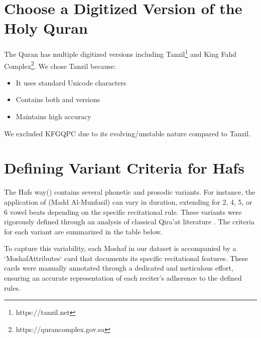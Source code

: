 
\section{Choose a Digitized Version of the Holy Quran}

The Quran has multiple digitized versions including Tanzil\footnote{https://tanzil.net} and King Fahd Complex\footnote{https://qurancomplex.gov.sa}. We chose Tanzil because:
\begin{itemize}
\item It uses standard Unicode characters
\item Contains both  and  versions
\item Maintains high accuracy
\end{itemize}

We excluded KFGQPC due to its evolving/unstable nature compared to Tanzil.



\section{Defining Variant Criteria for Hafs}

The Hafs way() contains several phonetic and prosodic variants. For instance, the application of  (Madd Al-Munfasil) can vary in duration, extending for 2, 4, 5, or 6 vowel beats depending on the specific recitational rule. These variants were rigorously defined through an analysis of classical Qira'at literature \cite{al-dabbaa}. The criteria for each variant are summarized in the table below.

To capture this variability, each Moshaf in our dataset is accompanied by a `MoshafAttributes` card that documents its specific recitational features. These cards were manually annotated through a dedicated and meticulous effort, ensuring an accurate representation of each reciter's adherence to the defined rules.



